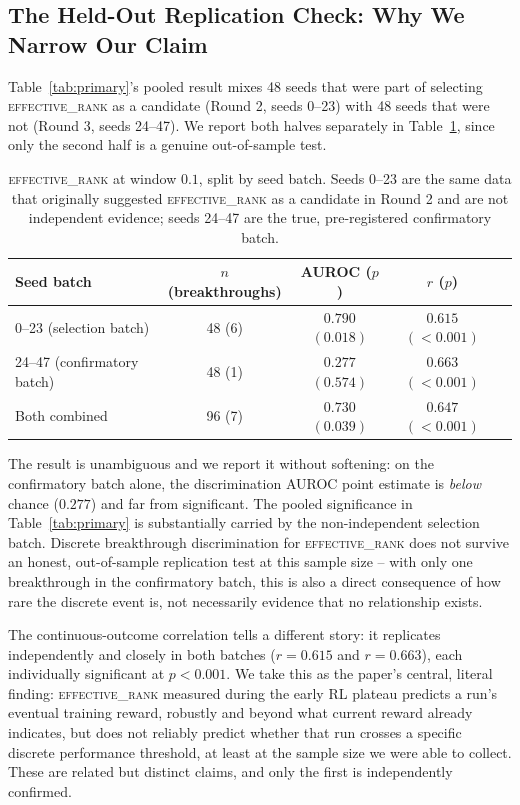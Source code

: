 \documentclass{article}
\newcommand{\erank}{\textsc{effective\_rank}}
\begin{document}
\subsection{The Held-Out Replication Check: Why We Narrow Our Claim}
\label{sec:heldout}

Table~\ref{tab:primary}'s pooled result mixes 48 seeds that were part of
selecting \erank{} as a candidate (Round 2, seeds 0--23) with 48 seeds that
were not (Round 3, seeds 24--47). We report both halves separately in
Table~\ref{tab:seedsplit}, since only the second half is a genuine
out-of-sample test.

\begin{table}[t]
\centering
\caption{\erank{} at window $0.1$, split by seed batch. Seeds 0--23 are the
same data that originally suggested \erank{} as a candidate in Round 2 and are
not independent evidence; seeds 24--47 are the true, pre-registered
confirmatory batch.}
\label{tab:seedsplit}
\begin{tabular}{lcccc}
\toprule
Seed batch & $n$ (breakthroughs) & AUROC ($p$) & $r$ ($p$) \\
\midrule
0--23 (selection batch) & 48 (6) & $0.790$ $(0.018)$ & $0.615$ $(<0.001)$ \\
24--47 (confirmatory batch) & 48 (1) & $0.277$ $(0.574)$ & $0.663$ $(<0.001)$ \\
Both combined & 96 (7) & $0.730$ $(0.039)$ & $0.647$ $(<0.001)$ \\
\bottomrule
\end{tabular}
\end{table}

The result is unambiguous and we report it without softening: on the
confirmatory batch alone, the discrimination AUROC point estimate is
\emph{below} chance ($0.277$) and far from significant. The pooled
significance in Table~\ref{tab:primary} is substantially carried by the
non-independent selection batch. Discrete breakthrough discrimination for
\erank{} does not survive an honest, out-of-sample replication test at this
sample size -- with only one breakthrough in the confirmatory batch, this is
also a direct consequence of how rare the discrete event is, not necessarily
evidence that no relationship exists.

The continuous-outcome correlation tells a different story: it replicates
independently and closely in both batches ($r{=}0.615$ and $r{=}0.663$), each
individually significant at $p<0.001$. We take this as the paper's central,
literal finding: \erank{} measured during the early RL plateau predicts a
run's eventual training reward, robustly and beyond what current reward
already indicates, but does not reliably predict whether that run crosses a
specific discrete performance threshold, at least at the sample size we were
able to collect. These are related but distinct claims, and only the first is
independently confirmed.
\end{document}
